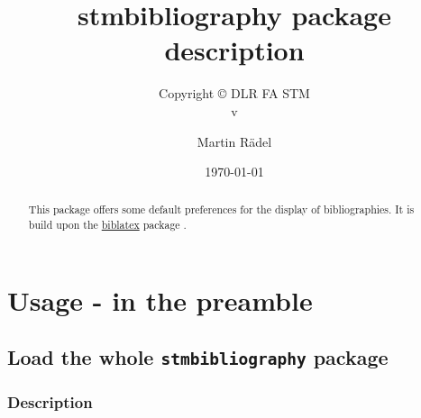 
\usepackage[T1]{fontenc}
\usepackage[utf8]{inputenc}
\usepackage{enumitem}

\usepackage[%
  style=stmdefault,%
]{stmbibliography}




\author{Martin R\"{a}del}
\title{stmbibliography package description}
\subtitle{Copyright \copyright{} \the\year{} DLR FA STM\\v\formatdate[versiondatestyle]{\DTMToday}}
\date{\today}




\maketitle

\begin{abstract}
This package offers some default preferences for the display of bibliographies. It is build upon the \href{https://ctan.org/pkg/biblatex}{biblatex} package \cite{biblatex314_20191201}.
\end{abstract}

\tableofcontents

\conditionallistoffigures  %
\conditionallistoftables   %
\conditionallistoflistings %

\section{Usage - in the preamble}

\subsection{Load the whole \protect\texttt{stmbibliography} package}
\label{sec:usage:preamble:wholepackage}

\subsubsection{Description}
\label{sec:usage:preamble:wholepackage:description}

